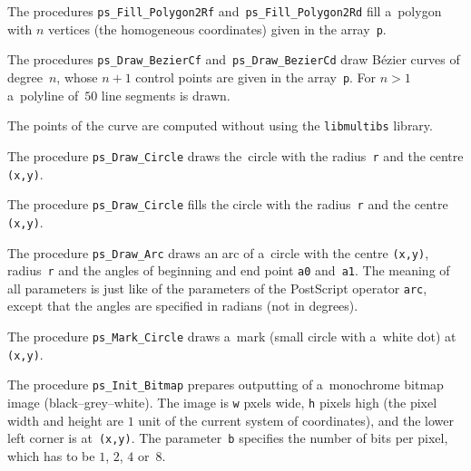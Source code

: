 \vspace{\bigskipamount}
The procedures \texttt{ps\_Fill\_Polygon2Rf} and~\texttt{ps\_Fill\_Polygon2Rd}
fill a~polygon with $n$ vertices (the homogeneous coordinates) given in the
array~\texttt{p}.

\vspace{\bigskipamount}
The procedures \texttt{ps\_Draw\_BezierCf} and~\texttt{ps\_Draw\_BezierCd}
draw B\'{e}zier curves of degree~$n$,
whose $n+1$ control points are given in the array~\texttt{p}. For
$n>1$ a~polyline of~$50$ line segments is drawn.

The points of the curve are computed without using the \texttt{libmultibs}
library.

\vspace{\bigskipamount}
The procedure \texttt{ps\_Draw\_Circle} draws the~circle with the radius~\texttt{r}
and the centre \texttt{(x,y)}.

\vspace{\bigskipamount}
The procedure \texttt{ps\_Draw\_Circle} fills the circle with the radius~\texttt{r}
and the centre \texttt{(x,y)}.

\pagebreak[1]
\vspace{\bigskipamount}
The procedure \texttt{ps\_Draw\_Arc} draws an arc of a~circle with the
centre \texttt{(x,y)}, radius~\texttt{r} and the angles of beginning and
end point \texttt{a0} and~\texttt{a1}. The meaning of all parameters is just
like of the parameters of the PostScript operator \texttt{arc}, except that
the angles are specified in radians (not in degrees).

\vspace{\bigskipamount}
The procedure \texttt{ps\_Mark\_Circle} draws a~mark (small circle
with a~white dot) at \texttt{(x,y)}.

\vspace{\bigskipamount}
The procedure \texttt{ps\_Init\_Bitmap} prepares outputting of a~monochrome
bitmap image (black--grey--white). The image is \texttt{w} pxels wide,
\texttt{h} pixels high (the pixel width and height are $1$ unit
of the current system of coordinates), and the lower left corner
is at~\texttt{(x,y)}. The parameter~\texttt{b} specifies the number of
bits per pixel, which has to be $1$, $2$, $4$ or~$8$.

